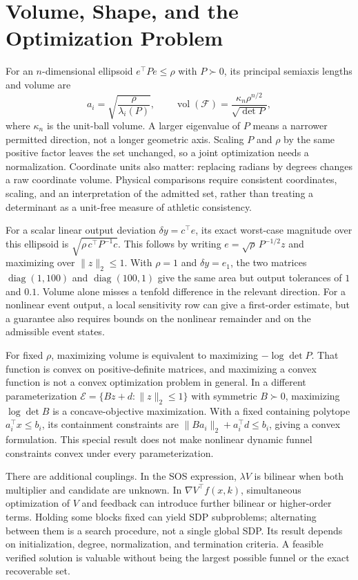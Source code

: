 \section{Volume, Shape, and the Optimization Problem}

For an $n$-dimensional ellipsoid $e^\top P e\leq\rho$ with $P\succ0$, its principal semiaxis lengths and volume are
\begin{equation}
 a_i=\sqrt{\frac{\rho}{\lambda_i(P)}},\qquad
 \operatorname{vol}(\mathcal F)=\frac{\kappa_n\rho^{n/2}}{\sqrt{\det P}},
 \label{eq:funnel_ellipsoid_volume}
\end{equation}
where $\kappa_n$ is the unit-ball volume. A larger eigenvalue of $P$ means a narrower permitted direction, not a longer geometric axis. Scaling $P$ and $\rho$ by the same positive factor leaves the set unchanged, so a joint optimization needs a normalization. Coordinate units also matter: replacing radians by degrees changes a raw coordinate volume. Physical comparisons require consistent coordinates, scaling, and an interpretation of the admitted set, rather than treating a determinant as a unit-free measure of athletic consistency.

For a scalar linear output deviation $\delta y=c^\top e$, its exact worst-case magnitude over this ellipsoid is $\sqrt{\rho\,c^\top P^{-1}c}$. This follows by writing $e=\sqrt\rho\,P^{-1/2}z$ and maximizing over $\|z\|_2\leq1$. With $\rho=1$ and $\delta y=e_1$, the two matrices $\operatorname{diag}(1,100)$ and $\operatorname{diag}(100,1)$ give the same area but output tolerances of $1$ and $0.1$. Volume alone misses a tenfold difference in the relevant direction. For a nonlinear event output, a local sensitivity row can give a first-order estimate, but a guarantee also requires bounds on the nonlinear remainder and on the admissible event states.

For fixed $\rho$, maximizing volume is equivalent to maximizing $-\log\det P$. That function is convex on positive-definite matrices, and maximizing a convex function is not a convex optimization problem in general. In a different parameterization $\mathcal E=\{Bz+d:\|z\|_2\leq1\}$ with symmetric $B\succ0$, maximizing $\log\det B$ is a concave-objective maximization. With a fixed containing polytope $a_i^\top x\leq b_i$, its containment constraints are $\|Ba_i\|_2+a_i^\top d\leq b_i$, giving a convex formulation. This special result does not make nonlinear dynamic funnel constraints convex under every parameterization.

There are additional couplings. In the SOS expression, $\lambda V$ is bilinear when both multiplier and candidate are unknown. In $\nabla V^\top f(x,k)$, simultaneous optimization of $V$ and feedback can introduce further bilinear or higher-order terms. Holding some blocks fixed can yield SDP subproblems; alternating between them is a search procedure, not a single global SDP. Its result depends on initialization, degree, normalization, and termination criteria. A feasible verified solution is valuable without being the largest possible funnel or the exact recoverable set.

